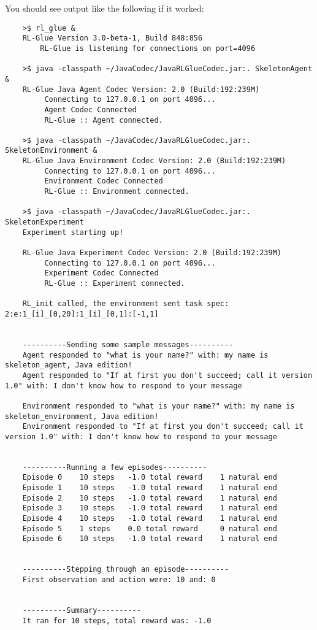 \documentclass[11pt]{article}
\begin{document}
You should see output like the following if it worked:
\begin{verbatim}
	>$ rl_glue & 
	RL-Glue Version 3.0-beta-1, Build 848:856
     	RL-Glue is listening for connections on port=4096

	>$ java -classpath ~/JavaCodec/JavaRLGlueCodec.jar:. SkeletonAgent &
	RL-Glue Java Agent Codec Version: 2.0 (Build:192:239M)
	     Connecting to 127.0.0.1 on port 4096...
	     Agent Codec Connected
	     RL-Glue :: Agent connected.
	
	>$ java -classpath ~/JavaCodec/JavaRLGlueCodec.jar:. SkeletonEnvironment &
	RL-Glue Java Environment Codec Version: 2.0 (Build:192:239M)
	     Connecting to 127.0.0.1 on port 4096...
	     Environment Codec Connected
	     RL-Glue :: Environment connected.

	>$ java -classpath ~/JavaCodec/JavaRLGlueCodec.jar:. SkeletonExperiment
	Experiment starting up!

	RL-Glue Java Experiment Codec Version: 2.0 (Build:192:239M)
	     Connecting to 127.0.0.1 on port 4096...
	     Experiment Codec Connected
	     RL-Glue :: Experiment connected.

	RL_init called, the environment sent task spec: 2:e:1_[i]_[0,20]:1_[i]_[0,1]:[-1,1]


	----------Sending some sample messages----------
	Agent responded to "what is your name?" with: my name is skeleton_agent, Java edition!
	Agent responded to "If at first you don't succeed; call it version 1.0" with: I don't know how to respond to your message

	Environment responded to "what is your name?" with: my name is skeleton_environment, Java edition!
	Environment responded to "If at first you don't succeed; call it version 1.0" with: I don't know how to respond to your message


	----------Running a few episodes----------
	Episode 0	 10 steps 	-1.0 total reward	 1 natural end
	Episode 1	 10 steps 	-1.0 total reward	 1 natural end
	Episode 2	 10 steps 	-1.0 total reward	 1 natural end
	Episode 3	 10 steps 	-1.0 total reward	 1 natural end
	Episode 4	 10 steps 	-1.0 total reward	 1 natural end
	Episode 5	 1 steps 	0.0 total reward	 0 natural end
	Episode 6	 10 steps 	-1.0 total reward	 1 natural end


	----------Stepping through an episode----------
	First observation and action were: 10 and: 0


	----------Summary----------
	It ran for 10 steps, total reward was: -1.0

\end{verbatim}
\end{document}
